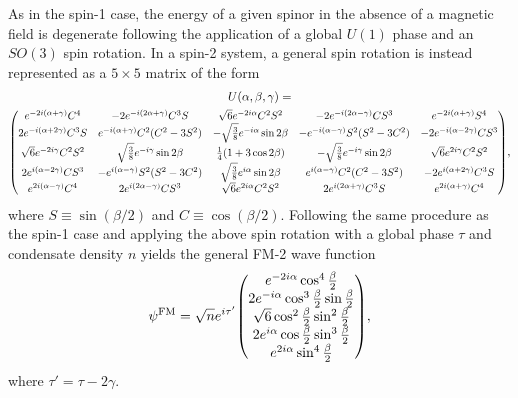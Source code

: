 As in the spin-1 case, the energy of a given spinor in the absence of a magnetic
field is degenerate following the application of a global \(U(1)\) phase and an
\(SO(3)\) spin rotation.
In a spin-2 system, a general spin rotation is instead represented as a
\(5\times 5\) matrix of the form
\begin{multline}\label{eq: spin-2-rotation-matrix}
    U(\alpha, \beta, \gamma) = \\
    \scalemath{0.90}{\mqty(
    e^{-2i(\alpha + \gamma)}C^4 & -2e^{-i(2\alpha+\gamma)}C^3S
    & \sqrt{6}e^{-2i\alpha}C^2S^2 & -2e^{-i(2\alpha-\gamma)}CS^3
    & e^{-2i(\alpha + \gamma)}S^4
    \\
    2e^{-i(\alpha+2\gamma)}C^3S & e^{-i(\alpha+\gamma)}C^2(C^2-3S^2)
    & -\sqrt{\frac{3}{8}}e^{-i\alpha}\sin 2\beta
    & -e^{-i(\alpha-\gamma)}S^2(S^2-3C^2) & -2e^{-i(\alpha-2\gamma)}CS^3
    \\
    \sqrt{6}e^{-2i\gamma}C^2S^2 & \sqrt{\frac{3}{8}}e^{-i\gamma}\sin 2\beta
    & \frac{1}{4}(1+3\cos 2\beta)
    & -\sqrt{\frac{3}{8}}e^{-i\gamma}\sin 2\beta
    & \sqrt{6}e^{2i\gamma}C^2S^2
    \\
    2e^{i(\alpha-2\gamma)}CS^3 & -e^{i(\alpha-\gamma)}S^2(S^2-3C^2)
    & \sqrt{\frac{3}{8}}e^{i\alpha}\sin 2\beta
    & e^{i(\alpha-\gamma)}C^2(C^2-3S^2) & -2e^{i(\alpha+2\gamma)}C^3S
    \\
    e^{2i(\alpha - \gamma)}C^4 & 2e^{i(2\alpha-\gamma)}CS^3
    & \sqrt{6}e^{2i\alpha}C^2S^2 & 2e^{i(2\alpha+\gamma)}C^3S
    & e^{2i(\alpha + \gamma)}C^4
    )},
\end{multline}
where \(S \equiv \sin(\beta/2)\) and \(C \equiv \cos(\beta/2)\).
Following the same procedure as the spin-1 case and applying the above spin
rotation with a global phase \(\tau \) and condensate density \(n\) yields the
general FM-2 wave function
\begin{equation}\label{eq: FM-2-representative-spinor}
    \psi^\mathrm{FM} = \sqrt{n}e^{i\tau'}\mqty(
    e^{-2i\alpha} \cos^4\frac{\beta}{2} \\
    2e^{-i\alpha}\cos^3\frac{\beta}{2}\sin \frac{\beta}{2} \\
    \sqrt{6} \cos^2\frac{\beta}{2} \sin^2\frac{\beta}{2} \\
    2e^{i\alpha}\cos\frac{\beta}{2} \sin^3\frac{\beta}{2} \\
    e^{2i\alpha} \sin^4\frac{\beta}{2}
    ),
\end{equation}
where \(\tau'=\tau-2\gamma \).

